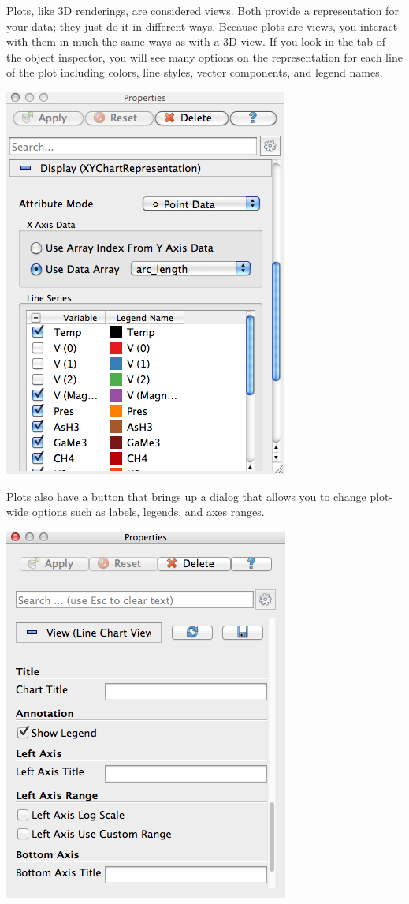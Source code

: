 Plots, like 3D renderings, are considered views.  Both provide a
representation for your data; they just do it in different ways.  Because
plots are views, you interact with them in much the same ways as with a 3D
view.  If you look in the  tab of the object inspector, you
will see many options on the representation for each line of the plot
including colors, line styles, vector components, and legend names.
\begin{inlinefig}
  \includegraphics[width=.5\scw]{images/PlotDisplayTab}
\end{inlinefig}

Plots also have a  button that brings up a dialog that
allows you to change plot-wide options such as labels, legends, and axes
ranges.
\begin{inlinefig}
  \includegraphics[width=.66\scw]{images/PlotViewOptions}
\end{inlinefig}

